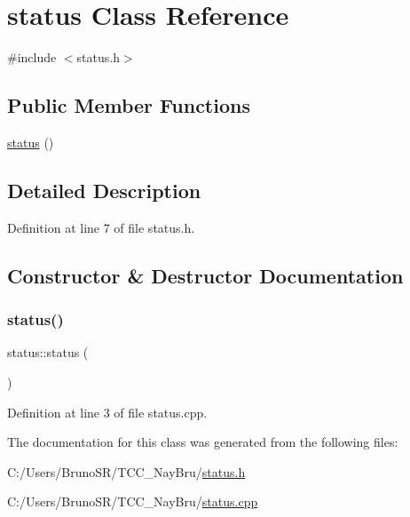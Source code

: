 \hypertarget{classstatus}{}\section{status Class Reference}
\label{classstatus}


{\ttfamily \#include $<$status.\+h$>$}

\subsection*{Public Member Functions}
\begin{DoxyCompactItemize}
\item 
\hyperlink{classstatus_a22e483f0410490743e4970e905e5fa19}{status} ()
\end{DoxyCompactItemize}


\subsection{Detailed Description}


Definition at line 7 of file status.\+h.



\subsection{Constructor \& Destructor Documentation}
\hypertarget{classstatus_a22e483f0410490743e4970e905e5fa19}{}\label{classstatus_a22e483f0410490743e4970e905e5fa19} 
\subsubsection{\texorpdfstring{status()}{status()}}
{\footnotesize\ttfamily status\+::status (\begin{DoxyParamCaption}{ }\end{DoxyParamCaption})}



Definition at line 3 of file status.\+cpp.



The documentation for this class was generated from the following files\+:\begin{DoxyCompactItemize}
\item 
C\+:/\+Users/\+Bruno\+S\+R/\+T\+C\+C\+\_\+\+Nay\+Bru/\hyperlink{status_8h}{status.\+h}\item 
C\+:/\+Users/\+Bruno\+S\+R/\+T\+C\+C\+\_\+\+Nay\+Bru/\hyperlink{status_8cpp}{status.\+cpp}\end{DoxyCompactItemize}
